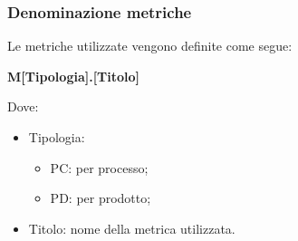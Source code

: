 \subsubsection{Denominazione metriche}

Le metriche utilizzate vengono definite come segue:

\begin{center}
    \large{\textbf{M[Tipologia].[Titolo]}}
\end{center}

Dove:
    \begin{itemize}
        \item Tipologia: \begin{itemize}
            \item PC: per processo;
            \item PD: per prodotto;
        \end{itemize}
        \item Titolo: nome della metrica utilizzata.
    \end{itemize}

